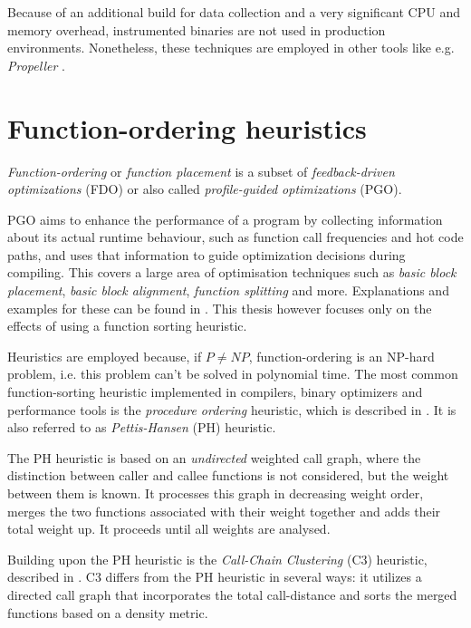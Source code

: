\enlargethispage{3\baselineskip}
Because of an additional build for data collection and a very significant CPU and memory overhead, instrumented binaries are not used in production environments. \cite{bolt} Nonetheless, these techniques are employed in other tools like e.g. \textit{Propeller} \cite{propeller}.

\section{Function-ordering heuristics}\label{chapt:heuristic}

\textit{Function-ordering} or \textit{function placement} is a subset of \textit{feedback-driven optimizations} (FDO) or also called \textit{profile-guided optimizations} (PGO). \cite[p. 122]{brendan} \cite{bolt}

PGO aims to enhance the performance of a program by collecting information about its actual runtime behaviour, such as function call frequencies and hot code paths, and uses that information to guide optimization decisions during compiling. \cite{kernel_pgo} \cite[p. 122]{brendan} \cite{intelpgo}  This covers a large area of optimisation techniques such as \textit{basic block placement}, \textit{basic block alignment}, \textit{function splitting} and more. Explanations and examples for these can be found in \cite[p. 103-111]{patmc}. This thesis however focuses only on the effects of using a function sorting heuristic. 

Heuristics are employed because, if $P \neq NP$, function-ordering is an NP-hard problem, i.e. this problem can't be solved in polynomial time. \cite{codestitcher}  \cite{np-hard-explained} \cite{nphard} The most common function-sorting heuristic implemented in compilers, binary optimizers and performance tools is the \textit{procedure ordering} heuristic, which is described in \cite{phheuristic}. It is also referred to as \textit{Pettis-Hansen} (PH) heuristic. \cite{codestitcher} \cite{hfsort}

The PH heuristic is based on an \textit{undirected} weighted call graph, where the distinction between caller and callee functions is not considered, but the weight between them is known. It processes this graph in decreasing weight order, merges the two functions associated with their weight together and adds their total weight up. It proceeds until all weights are analysed. \cite{anticodestitcher} \cite{hfsort}  \cite{phheuristic}

Building upon the PH heuristic is the \textit{Call-Chain Clustering} (C3) heuristic, described in \cite{hfsort}. C3 differs from the PH heuristic in several ways: it utilizes a directed call graph that incorporates the total call-distance and sorts the merged functions based on a density metric.

